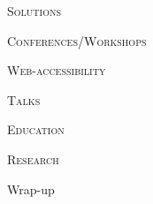 \documentclass{beamer}
\begin{document}
\begin{minipage}{0.42\linewidth}
\begin{Large}
\begin{center}
\textsc{Solutions}
\end{center}
\end{Large}
\begin{large}
\textsc{Conferences/Workshops\\}
\end{large}
\begin{large}
\textsc{Web-accessibility\\}
\end{large}
\begin{large}
\textsc{Talks\\}
\end{large}
\begin{large}
\textsc{Education\\}
\end{large}
\begin{large}
\textsc{Research\\}
\end{large}
\end{minipage}
\begin{minipage}{0.25\linewidth}
\begin{Large}
\begin{center}
Wrap-up
\end{center}
\end{Large}
\end{minipage}
\end{document}
